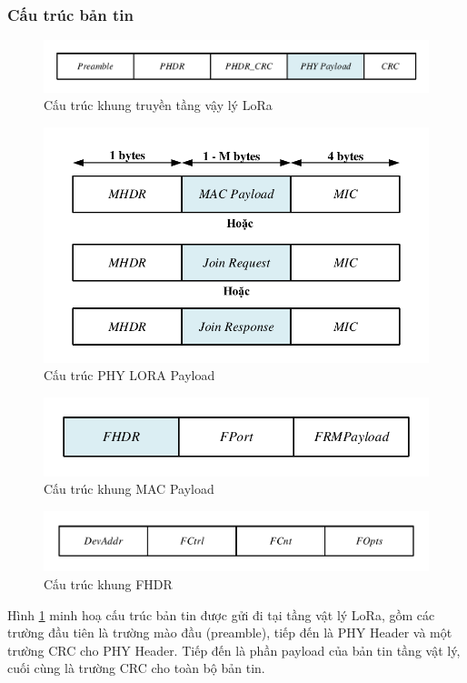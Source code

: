 \subsubsection{Cấu trúc bản tin}
	\begin{figure}[h!] %
			\centering
			\includegraphics[width=0.8\linewidth]{./img/210.pdf}
			\caption{Cấu trúc khung truyền tầng vậy lý LoRa}
			\label{fig:fig210}
	\end{figure}
		\begin{figure}[h!] %
			\centering
			\includegraphics[width=0.7\linewidth]{./img/211.pdf}
			\caption{Cấu trúc PHY LORA Payload}
			\label{fig:fig211}
	\end{figure}
		\begin{figure}[h!] %
			\centering
			\includegraphics[width=0.7\linewidth]{./img/212.pdf}
			\caption{Cấu trúc khung MAC Payload}
			\label{fig:fig212}
	\end{figure}
		\begin{figure}[h!] %
			\centering
			\includegraphics[width=0.8\linewidth]{./img/213.pdf}
			\caption{Cấu trúc khung FHDR}
			\label{fig:fig213}
	\end{figure}
	Hình \ref{fig:fig210} minh hoạ cấu trúc bản tin được gửi đi tại tầng vật lý LoRa, gồm các trường đầu tiên là trường mào đầu (preamble), tiếp đến là PHY Header và một trường CRC cho PHY Header. Tiếp đến là phần payload của bản tin tầng vật lý, cuối cùng là trường CRC cho toàn bộ bản tin. \par 
